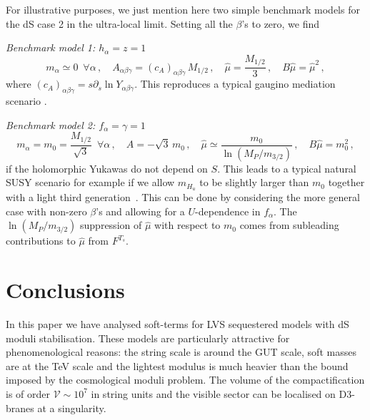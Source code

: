 \documentclass[11pt,a4paper]{article}
\newcommand{\be}{\begin{equation}}
\newcommand{\ee}{\end{equation}}
\newcommand\vo{{\mathcal{V}}}
\begin{document}
For illustrative purposes, we just mention here two simple benchmark models for the dS case 2 in the ultra-local limit.
Setting all the $\beta$'s to zero, we find

\medskip
\emph{Benchmark model 1: $h_\alpha=z=1$}
\be
m_\alpha \simeq 0\,\,\,\forall\alpha\,,\quad A_{\alpha\beta\gamma} = (c_A)_{\alpha\beta\gamma}\,M_{1/2}\,,
\quad\hat\mu= \frac{M_{1/2}}{3} \,,\quad B\hat\mu = \hat\mu^2\,,
\ee
where $(c_A)_{\alpha\beta\gamma}=s\partial_s \ln Y_{\alpha\beta\gamma}$.
This reproduces a typical gaugino mediation scenario \cite{Schmaltz:2000gy,Yanagida:2013ah}.

\medskip
\emph{Benchmark model 2: $f_\alpha=\gamma=1$}
\be
m_\alpha = m_0 = \frac{M_{1/2}}{\sqrt{3}}\,\,\,\forall\alpha\,,\quad A = -\sqrt{3}\,m_0\,,
\quad\hat\mu \simeq \frac{m_0}{\ln\left(M_P/m_{3/2}\right)}\,,\quad B\hat\mu = m_0^2\,,
\ee
if the holomorphic Yukawas do not depend on $S$.
This leads to a typical natural SUSY scenario for example
if we allow $m_{H_u}$ to be slightly larger than $m_0$ together with a light third generation~\cite{Baer:2012uy}.
This can be done by considering the more general case with non-zero
$\beta$'s and allowing for a $U$-dependence in $f_\alpha$. The $\ln\left(M_P/m_{3/2}\right)$ suppression of $\hat\mu$ with respect to $m_0$ comes from subleading contributions to $\hat\mu$ from $F^{T_s}$.


\section{Conclusions}
\label{sec:conclusions}

In this paper we have analysed soft-terms for LVS sequestered models with dS moduli stabilisation.
These models are particularly attractive for phenomenological reasons: the string scale is
around the GUT scale, soft masses are at the TeV scale and the lightest modulus is much heavier than the bound imposed by the cosmological moduli problem.
The volume of the compactification is of order $\vo\sim 10^7$ in string units and the visible sector can be localised on D3-branes at a singularity.
\end{document}
